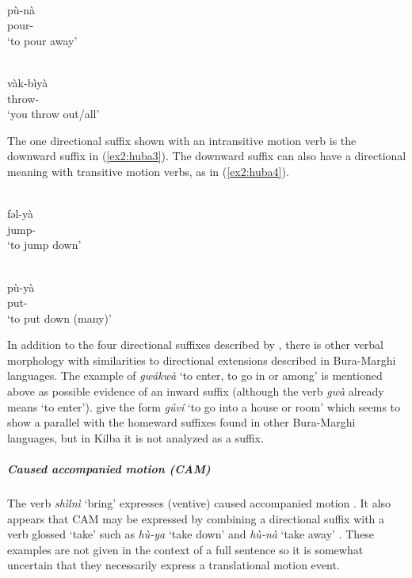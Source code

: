 \ea\label{ex2:huba1}
 \\
\gll pù-nà \\
pour- \\
\glt `to pour away'

\ex\label{ex2:huba2}
 \\
\gll vàk-bìyà	 \\
throw- \\
\glt `you throw out/all'
\z 

The one directional suffix shown with an intransitive motion verb is the downward suffix in (\ref{ex2:huba3}). The downward suffix can also have a directional meaning with transitive motion verbs, as in (\ref{ex2:huba4}). 

\ea\label{ex2:huba3}
 \\
\gll fəl-yà \\
jump- \\
\glt `to jump down'

\ex\label{ex2:huba4}
 \\
\gll pù-yà \\
put- \\
\glt `to put down (many)'
\z 

In addition to the four directional suffixes described by \citet{muazuGrammarKilbaLanguage2009}, there is other verbal morphology with similarities to directional extensions described in Bura-Marghi languages. The example of \textit{gwákwà} `to enter, to go in or among' is mentioned above as possible evidence of an inward suffix (although the verb \textit{gwà} already means `to enter'). \citet[24]{muazuModernKilbaDictionary2015} give the form \textit{gúví} `to go into a house or room' which seems to show a parallel with the homeward suffixes found in other Bura-Marghi languages, but in Kilba it is not analyzed as a suffix.

\subparagraph{Caused accompanied motion (CAM)}

The verb \textit{shìlnì} `bring' expresses (ventive) caused accompanied motion \citep[79]{muazuModernKilbaDictionary2015}. It also appears that CAM may be expressed by combining a directional suffix with a verb glossed `take' such as \textit{hù-ya} `take down' and \textit{hù-nà} `take away'  \citep[108--109]{muazuGrammarKilbaLanguage2009}. These examples are not given in the context of a full sentence so it is somewhat uncertain that they necessarily express a translational motion event. 

